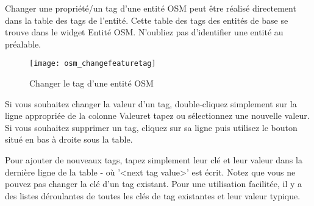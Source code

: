 Changer une propriété/un tag d'une entité OSM peut être réalisé directement dans la table des tags de l'entité. Cette table des tags des entités de base se trouve dans le widget Entité OSM. N'oubliez pas d'identifier une entité au préalable.

\begin{figure}[ht]
\centering
   \texttt{[image: osm\_changefeaturetag]}
   \caption{Changer le tag d'une entité OSM \nixcaption}\label{fig:osmchfeattag}\smallskip
\end{figure}

Si vous souhaitez changer la valeur d'un tag, double-cliquez simplement sur la ligne appropriée de la colonne \og Valeur\fg et tapez ou sélectionnez une nouvelle valeur. Si vous souhaitez supprimer un tag, cliquez sur sa ligne puis utilisez le bouton  situé en bas à droite sous la table.

Pour ajouter de nouveaux tags, tapez simplement leur clé et leur valeur dans la dernière ligne de la table - où '<next tag value>' est écrit. Notez que vous ne pouvez pas changer la clé d'un tag existant. Pour une utilisation facilitée, il y a des listes déroulantes de toutes les clés de tag existantes et leur valeur typique.


